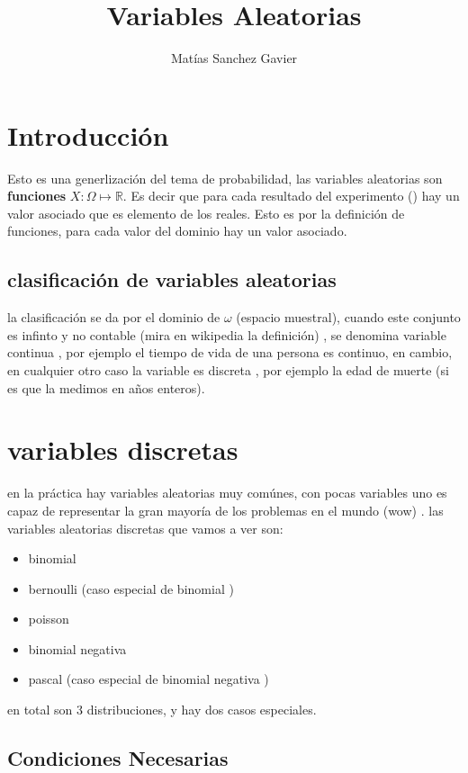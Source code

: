 \documentclass[a4paper]{article}
\title{Variables Aleatorias}
\author{Matías Sanchez Gavier }
\begin{document}
\maketitle

\section{Introducción}
Esto es una  generlización del tema de probabilidad, las variables aleatorias son \textbf{funciones} $ X: \Omega \mapsto \mathbb{R}  $. Es decir que para cada resultado
del experimento () hay un valor asociado que es elemento de los reales. Esto es por la definición de funciones, para cada valor
del dominio hay un valor asociado. 





\subsection{ clasificación de variables aleatorias } 
la clasificación se da por el dominio de $\omega$ (espacio muestral), cuando este conjunto es infinto y no contable (mira en wikipedia la definición) , se denomina {\color{blue} variable continua}  , por ejemplo
el tiempo de vida de una persona es continuo, en cambio, en cualquier otro caso la variable es  {\color{blue} discreta} , por ejemplo la edad de muerte  (si es que la medimos en años enteros). 


\section{variables discretas}
en la práctica hay variables aleatorias muy comúnes, con pocas variables uno es capaz de representar la gran mayoría de los problemas en el mundo (wow) . las variables aleatorias discretas que vamos a  
ver son: 

\begin{itemize}
	\item  binomial
	\item  bernoulli (caso especial de binomial )
	\item poisson 
	\item binomial negativa 
	\item pascal  (caso especial de binomial negativa )
\end{itemize}

en total son 3 distribuciones, y hay dos casos especiales.




\subsection{ Condiciones Necesarias } 










 
\end{document}
